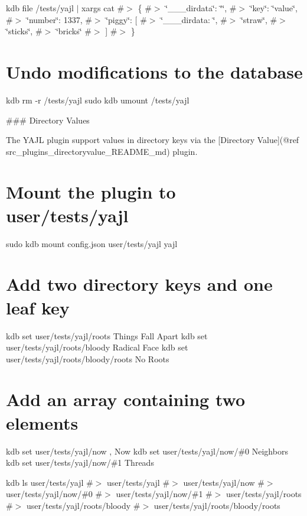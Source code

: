 kdb file /tests/yajl $\vert$ xargs cat \#$>$ \{ \#$>$ \char`\"{}\+\_\+\+\_\+\+\_\+dirdata\char`\"{}\+: \char`\"{}\char`\"{}, \#$>$ \char`\"{}key\char`\"{}\+: \char`\"{}value\char`\"{}, \#$>$ \char`\"{}number\char`\"{}\+: 1337, \#$>$ \char`\"{}piggy\char`\"{}\+: \mbox{[} \#$>$ \char`\"{}\+\_\+\+\_\+\+\_\+dirdata\+: \char`\"{}, \#$>$ \char`\"{}straw\char`\"{}, \#$>$ \char`\"{}sticks\char`\"{}, \#$>$ \char`\"{}bricks\char`\"{} \#$>$ \mbox{]} \#$>$ \}

\section*{Undo modifications to the database}

kdb rm -\/r /tests/yajl sudo kdb umount /tests/yajl 
\begin{DoxyCode}
### Directory Values

The YAJL plugin support values in directory keys via the [Directory Value](@ref
       src\_plugins\_directoryvalue\_README\_md) plugin.
\end{DoxyCode}
 \section*{Mount the plugin to {\ttfamily user/tests/yajl}}

sudo kdb mount config.\+json user/tests/yajl yajl

\section*{Add two directory keys and one leaf key}

kdb set user/tests/yajl/roots \textquotesingle{}Things Fall Apart\textquotesingle{} kdb set user/tests/yajl/roots/bloody \textquotesingle{}Radical Face\textquotesingle{} kdb set user/tests/yajl/roots/bloody/roots \textquotesingle{}No Roots\textquotesingle{}

\section*{Add an array containing two elements}

kdb set user/tests/yajl/now \textquotesingle{}, Now\textquotesingle{} kdb set user/tests/yajl/now/\#0 \textquotesingle{}Neighbors\textquotesingle{} kdb set user/tests/yajl/now/\#1 \textquotesingle{}Threads\textquotesingle{}

kdb ls user/tests/yajl \#$>$ user/tests/yajl \#$>$ user/tests/yajl/now \#$>$ user/tests/yajl/now/\#0 \#$>$ user/tests/yajl/now/\#1 \#$>$ user/tests/yajl/roots \#$>$ user/tests/yajl/roots/bloody \#$>$ user/tests/yajl/roots/bloody/roots

